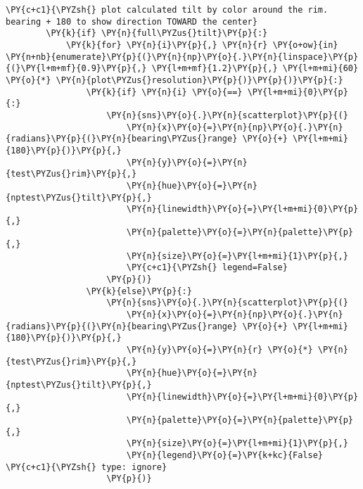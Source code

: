 \begin{tcolorbox}[breakable, size=fbox, boxrule=1pt, pad at break*=1mm,colback=cellbackground, colframe=cellborder]
\begin{Verbatim}[commandchars=\\\{\}]
        \PY{c+c1}{\PYZsh{} plot calculated tilt by color around the rim. bearing + 180 to show direction TOWARD the center}
        \PY{k}{if} \PY{n}{full\PYZus{}tilt}\PY{p}{:}
            \PY{k}{for} \PY{n}{i}\PY{p}{,} \PY{n}{r} \PY{o+ow}{in} \PY{n+nb}{enumerate}\PY{p}{(}\PY{n}{np}\PY{o}{.}\PY{n}{linspace}\PY{p}{(}\PY{l+m+mf}{0.9}\PY{p}{,} \PY{l+m+mf}{1.2}\PY{p}{,} \PY{l+m+mi}{60} \PY{o}{*} \PY{n}{plot\PYZus{}resolution}\PY{p}{)}\PY{p}{)}\PY{p}{:}
                \PY{k}{if} \PY{n}{i} \PY{o}{==} \PY{l+m+mi}{0}\PY{p}{:}
                    \PY{n}{sns}\PY{o}{.}\PY{n}{scatterplot}\PY{p}{(}
                        \PY{n}{x}\PY{o}{=}\PY{n}{np}\PY{o}{.}\PY{n}{radians}\PY{p}{(}\PY{n}{bearing\PYZus{}range} \PY{o}{+} \PY{l+m+mi}{180}\PY{p}{)}\PY{p}{,}
                        \PY{n}{y}\PY{o}{=}\PY{n}{test\PYZus{}rim}\PY{p}{,}
                        \PY{n}{hue}\PY{o}{=}\PY{n}{nptest\PYZus{}tilt}\PY{p}{,}
                        \PY{n}{linewidth}\PY{o}{=}\PY{l+m+mi}{0}\PY{p}{,}
                        \PY{n}{palette}\PY{o}{=}\PY{n}{palette}\PY{p}{,}
                        \PY{n}{size}\PY{o}{=}\PY{l+m+mi}{1}\PY{p}{,}
                        \PY{c+c1}{\PYZsh{} legend=False}
                    \PY{p}{)}
                \PY{k}{else}\PY{p}{:}
                    \PY{n}{sns}\PY{o}{.}\PY{n}{scatterplot}\PY{p}{(}
                        \PY{n}{x}\PY{o}{=}\PY{n}{np}\PY{o}{.}\PY{n}{radians}\PY{p}{(}\PY{n}{bearing\PYZus{}range} \PY{o}{+} \PY{l+m+mi}{180}\PY{p}{)}\PY{p}{,}
                        \PY{n}{y}\PY{o}{=}\PY{n}{r} \PY{o}{*} \PY{n}{test\PYZus{}rim}\PY{p}{,}
                        \PY{n}{hue}\PY{o}{=}\PY{n}{nptest\PYZus{}tilt}\PY{p}{,}
                        \PY{n}{linewidth}\PY{o}{=}\PY{l+m+mi}{0}\PY{p}{,}
                        \PY{n}{palette}\PY{o}{=}\PY{n}{palette}\PY{p}{,}
                        \PY{n}{size}\PY{o}{=}\PY{l+m+mi}{1}\PY{p}{,}
                        \PY{n}{legend}\PY{o}{=}\PY{k+kc}{False}  \PY{c+c1}{\PYZsh{} type: ignore}
                    \PY{p}{)}
    

\end{Verbatim}
\end{tcolorbox}
